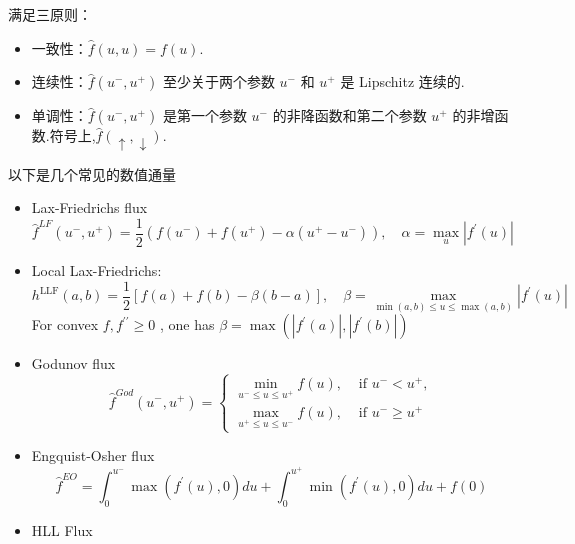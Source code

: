 \documentclass{book}
\begin{document}
满足三原则：
\begin{itemize}
    \item 一致性：$\widehat{f}(u, u)=f(u)$.
    \item 连续性：$\widehat{f}\left(u^{-}, u^{+}\right)$ 至少关于两个参数 $u^{-}$ 和 $u^{+}$ 是 Lipschitz 连续的.
    \item 单调性：$\widehat{f}\left(u^{-}, u^{+}\right)$ 是第一个参数 $u^{-}$ 的非降函数和第二个参数 $u^{+}$ 的非增函数.符号上,$\widehat{f}(\uparrow, \downarrow)$.
\end{itemize}
以下是几个常见的数值通量\cite{RN16}
\begin{itemize}
    \item Lax-Friedrichs flux
          \begin{equation}
              \widehat{f}^{L F}\left(u^{-}, u^{+}\right)=\frac{1}{2}\left(f\left(u^{-}\right)+f\left(u^{+}\right)-\alpha\left(u^{+}-u^{-}\right)\right), \quad \alpha=\max _{u}\left|f^{\prime}(u)\right|
          \end{equation}
    \item Local Lax-Friedrichs:
          \begin{equation}
              h^{\mathrm{LLF}}(a, b)=\frac{1}{2}[f(a)+f(b)-\beta(b-a)], \quad \beta=\max _{\min (a, b) \leq u \leq \max (a, b)}\left|f^{\prime}(u)\right|
          \end{equation}
          For convex  $f, f^{\prime \prime} \geq 0$ , one has  $\beta=\max \left(\left|f^{\prime}(a)\right|,\left|f^{\prime}(b)\right|\right) $
    \item Godunov flux
          \begin{equation}
              \widehat{f}^{G o d}\left(u^{-}, u^{+}\right)=\left\{\begin{array}{ll}
                  \min _{u^{-} \leq u \leq u^{+}} f(u), & \text { if } u^{-}<u^{+},     \\
                  \max _{u^{+} \leq u \leq u^{-}} f(u), & \text { if } u^{-} \geq u^{+}
              \end{array}\right.
          \end{equation}
    \item Engquist-Osher flux
          \begin{equation}
              \widehat{f}^{E O}=\int_{0}^{u^{-}} \max \left(f^{\prime}(u), 0\right) d u+\int_{0}^{u^{+}} \min \left(f^{\prime}(u), 0\right) d u+f(0)
          \end{equation}
    \item HLL Flux

\end{itemize}
\end{document}

